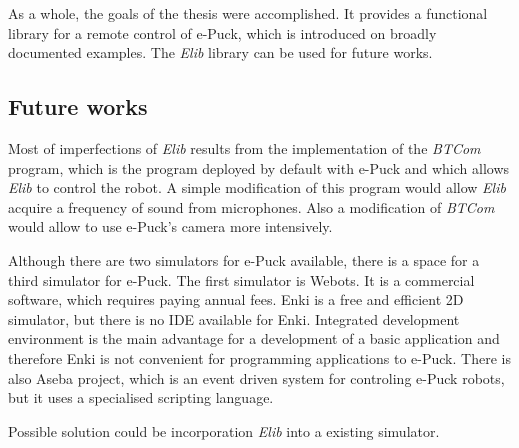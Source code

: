 	As a whole, the goals of the thesis were accomplished. It provides a functional library for
	a remote control of e-Puck, which is introduced on broadly documented examples.
	The {\it Elib} library can be used for future works.

\subsection*{Future works}
	Most of imperfections of {\it Elib} results from the implementation of the {\it BTCom} program,
	which is the program deployed by default with e-Puck and which allows {\it Elib} to control the robot.
	A simple modification of this program would allow {\it Elib} acquire a frequency of sound from microphones.
	Also a modification of {\it BTCom} would allow to use e-Puck's camera more intensively.

	Although there are two simulators for e-Puck available, there is a space for a third simulator for e-Puck.
	The first simulator is Webots. It is a commercial software, which requires paying annual fees.
	Enki is a free and efficient 2D simulator, but there is no IDE available for Enki. Integrated
	development environment is the main advantage for a development of a basic application and therefore Enki is not
	convenient for programming applications to e-Puck.
	There is also Aseba project, which is an event driven system for controling e-Puck robots, 
	but it uses a specialised scripting language.

	Possible solution could be incorporation {\it Elib} into a existing simulator.

